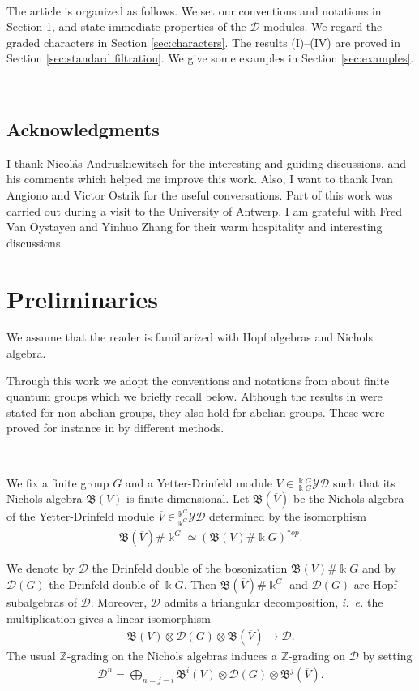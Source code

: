 \documentclass[reqno]{amsart}
\newcommand{\oV}{\overline{V}}
\renewcommand{\_}[1]{_{\left( #1 \right)}}
\renewcommand{\^}[1]{^{\left( #1 \right)}}
\newcommand{\ot}{{\otimes}}
\newcommand{\ku}{\Bbbk}
\newcommand{\Z}{{\mathbb Z}}
\newcommand{\D}{\mathcal{D}}
\newcommand{\BV}{{\mathfrak B}}
\newcommand{\ydg}{{}^{\ku G}_{\ku G}\mathcal{YD}}
\newcommand{\ydgdual}{{}^{\ku^G}_{\ku^G}\mathcal{YD}}
\theoremstyle{plain}
\theoremstyle{definition}
\theoremstyle{remark}
\begin{document}
\


The article is organized as follows. We set our conventions and notations in Section \ref{sec:Preliminaries}, and state immediate properties of the $\D$-modules. We regard the graded characters in Section \ref{sec:characters}. The results (I)--(IV) are proved in Section \ref{sec:standard filtration}. We give some examples in Section \ref{sec:examples}.

\

\subsection*{Acknowledgments} 
I thank Nicol\'as Andruskiewitsch for the interesting and guiding discussions, and his comments which helped me improve this work. Also, I want to thank Ivan Angiono and Victor Ostrik for the useful conversations. Part of this work was carried out during a visit to the University of Antwerp. I am grateful with Fred Van Oystayen and Yinhuo Zhang for their warm hospitality and interesting discussions.

\section{Preliminaries}\label{sec:Preliminaries}
We assume that the reader is familiarized with Hopf algebras and Nichols algebra.

Through this work we adopt the conventions and notations from \cite[Section 3]{PV2} about finite quantum groups which we briefly recall below. 
Although the results in \cite{PV2} were stated for non-abelian groups, they also hold for abelian groups. These were proved for instance in \cite{MR3367089,MR2732981,MR2407847,MR2840165,MR2279242,MR2504492} by different methods.

\

We fix a finite group $G$ and a Yetter-Drinfeld module $V\in\ydg$ such that its Nichols algebra $\BV(V)$ is finite-dimensional. Let $\BV(\oV)$ be the Nichols algebra of the Yetter-Drinfeld module $\oV\in\ydgdual$ determined by the isomorphism
\begin{align*}
\BV(\oV)\#\ku^G\simeq(\BV(V)\#\ku G)^{*op}.
\end{align*}


We denote by $\D$ the Drinfeld double of the bosonization $\BV(V)\#\ku G$ and by $\D(G)$ the Drinfeld double of $\ku G$. Then $\BV(\oV)\#\ku^G$ and $\D(G)$ are Hopf subalgebras of $\D$. Moreover, $\D$ admits a triangular decomposition, {\it i.~e.} the multiplication gives a linear isomorphism
\begin{align*}
\BV(V)\ot\D(G)\ot\BV(\oV)\longrightarrow\D.
\end{align*}
The usual $\Z$-grading on the Nichols algebras induces a $\Z$-grading on $\D$ by setting
\begin{align*}
\D^n=\bigoplus_{n=j-i}\BV^i(V)\ot\D(G)\ot\BV^j(\oV).
\end{align*}
\end{document}
